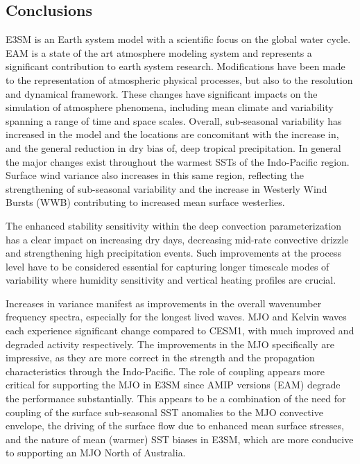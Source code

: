 \documentclass[draft,ms]{AGUTeX}
\begin{document}
\begin{article}
\section{Conclusions}
\label{sec:conclusions}
E3SM is an Earth system model with a scientific focus on the global water cycle. EAM is a state of the art atmosphere modeling system and represents a significant contribution to earth system research. Modifications have been made to the representation of atmospheric physical processes, but also to the resolution and dynamical framework. These changes have significant impacts on the simulation of atmosphere phenomena, including mean climate and variability spanning a range of time and space scales. Overall, sub-seasonal variability has increased in the model and the locations are concomitant with the increase in, and the general reduction in dry bias of, deep tropical precipitation. In general the major changes exist throughout the warmest SSTs of the Indo-Pacific region. Surface wind variance also increases in this same region, reflecting the strengthening of sub-seasonal variability and the increase in Westerly Wind Bursts (WWB) contributing to increased mean surface westerlies.

The enhanced stability sensitivity within the deep convection parameterization has a clear impact on increasing dry days, decreasing mid-rate convective drizzle and strengthening high precipitation events. Such improvements at the process level have to be considered essential for capturing longer timescale modes of variability where humidity sensitivity and vertical heating profiles are crucial. 

Increases in variance manifest as improvements in the overall wavenumber frequency spectra, especially for the longest lived waves. MJO and Kelvin waves each experience significant change compared to CESM1, with much improved and degraded activity respectively. The improvements in the MJO specifically are impressive, as they are more correct in the strength and the propagation characteristics through the Indo-Pacific. The role of coupling appears more critical for supporting the MJO in E3SM since AMIP versions (EAM) degrade the performance substantially. This appears to be a combination of the need for coupling of the surface sub-seasonal SST anomalies to the MJO convective envelope, the driving of the surface flow due to enhanced mean surface stresses, and the nature of mean (warmer) SST biases in E3SM, which are more conducive to supporting an MJO North of Australia. 


\end{article}
\end{document}
